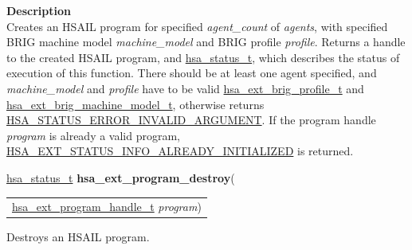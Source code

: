 \documentclass[final]{book}
\newcommand{\hsaarg}[1]{\textit{#1}}
\begin{document}
\vspace{-4mm}\noindent\textbf{Description}\\[1mm]
Creates an HSAIL program for specified \textit{agent_count} of \textit{agents}, with specified BRIG machine model \textit{machine_model} and BRIG profile \textit{profile}. Returns a handle to the created HSAIL program, and \hyperlink{group__status_1gad755322e7ff95456520e8abdbe90d225}{hsa_status_t}, which describes the status of execution of this function. There should be at least one agent specified, and \textit{machine_model} and \textit{profile} have to be valid \hyperlink{group__FinalizerCoreApi_1gaf65d6aea5a7200a4300f65306c08ea6e}{hsa_ext_brig_profile_t} and \hyperlink{group__FinalizerCoreApi_1ga2079a73d7b54be5bb13026bac890dcbc}{hsa_ext_brig_machine_model_t}, otherwise returns \hyperlink{group__status_1ggad755322e7ff95456520e8abdbe90d225ac7d3651f75107d2a6a8ba3b25683c030}{HSA_STATUS_ERROR_INVALID_ARGUMENT}. If the program handle \textit{program} is already a valid program, \hyperlink{group__status_1ggad755322e7ff95456520e8abdbe90d225a0882e3ebb9cc8a5c6033c43ee7a6d898}{HSA_EXT_STATUS_INFO_ALREADY_INITIALIZED} is returned. 


\noindent\begin{tcolorbox}[breakable,nobeforeafter,colframe=white,colback=lightgray,left=0mm]
\hyperlink{group__status_1gad755322e7ff95456520e8abdbe90d225}{hsa_status_t} \hypertarget{group__HsailLinkerServiceLayer_1gad52eaf70ef7263cf188747e64553643f}{\textbf{hsa_ext_program_destroy}}(
\vspace{-3.5mm}\begin{longtable}{@{}p{\textwidth}}
\hspace{1.7em}\hyperlink{group__HsailLinkerServiceLayer_1gaea8d90863414407ddba7e318db7412f9}{hsa_ext_program_handle_t} \hsaarg{program})\end{longtable}

\end{tcolorbox}
Destroys an HSAIL program.
\end{document}
